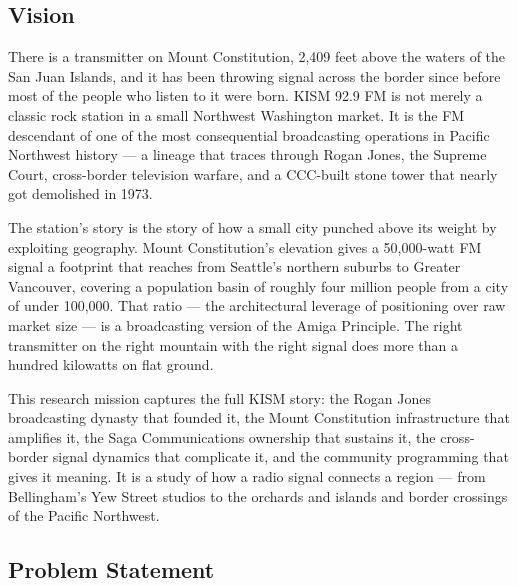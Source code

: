 \documentclass[11pt,letterpaper]{article}
\begin{document}
\subsection{Vision}

There is a transmitter on Mount Constitution, 2,409 feet above the waters of the San Juan Islands, and it has been throwing signal across the border since before most of the people who listen to it were born. KISM 92.9 FM is not merely a classic rock station in a small Northwest Washington market. It is the FM descendant of one of the most consequential broadcasting operations in Pacific Northwest history --- a lineage that traces through Rogan Jones, the Supreme Court, cross-border television warfare, and a CCC-built stone tower that nearly got demolished in 1973.

The station's story is the story of how a small city punched above its weight by exploiting geography. Mount Constitution's elevation gives a 50,000-watt FM signal a footprint that reaches from Seattle's northern suburbs to Greater Vancouver, covering a population basin of roughly four million people from a city of under 100,000. That ratio --- the architectural leverage of positioning over raw market size --- is a broadcasting version of the Amiga Principle. The right transmitter on the right mountain with the right signal does more than a hundred kilowatts on flat ground.

This research mission captures the full KISM story: the Rogan Jones broadcasting dynasty that founded it, the Mount Constitution infrastructure that amplifies it, the Saga Communications ownership that sustains it, the cross-border signal dynamics that complicate it, and the community programming that gives it meaning. It is a study of how a radio signal connects a region --- from Bellingham's Yew Street studios to the orchards and islands and border crossings of the Pacific Northwest.

\subsection{Problem Statement}
\end{document}
